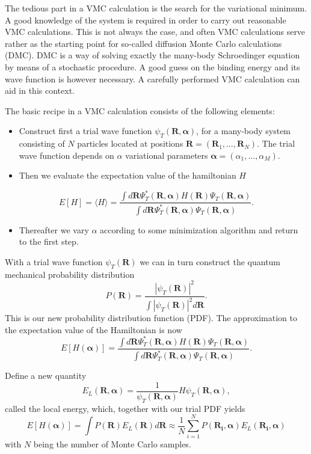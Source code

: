 The tedious part in a VMC calculation is the search for the variational
minimum. A good knowledge of the system is required in order to carry out
reasonable VMC calculations. This is not always the case, 
and often VMC calculations 
serve rather as the starting
point for so-called diffusion Monte Carlo calculations (DMC). DMC is a way of
solving exactly the many-body Schroedinger equation by means of 
a stochastic procedure. A good guess on the binding energy
and its wave function is however necessary. 
A carefully performed VMC calculation can aid in this context. 

The basic recipe in a VMC calculation consists of the following elements:

\begin{itemize}
\item Construct first a trial wave function $\psi_T(\bm{R},\bm{\alpha})$,  for a many-body system consisting of $N$ particles located at positions  $\bm{R}=(\bm{R}_1,\dots ,\bm{R}_N)$. The trial wave function depends on $\alpha$ variational parameters $\bm{\alpha}=(\alpha_1,\dots ,\alpha_M)$.

\item Then we evaluate the expectation value of the hamiltonian $H$ 
\end{itemize}

\noindent
\[
   E[H]=\langle H \rangle =
   \frac{\int d\bm{R}\Psi^{\ast}_{T}(\bm{R},\bm{\alpha})H(\bm{R})\Psi_{T}(\bm{R},\bm{\alpha})}
        {\int d\bm{R}\Psi^{\ast}_{T}(\bm{R},\bm{\alpha})\Psi_{T}(\bm{R},\bm{\alpha})}.
\]
\begin{itemize}
\item Thereafter we vary $\alpha$ according to some minimization algorithm and return to the first step.
\end{itemize}

\noindent
With a trial wave function $\psi_T(\bm{R})$ we can in turn construct the quantum mechanical probability distribution
\[
   P(\bm{R})= \frac{\left|\psi_T(\bm{R})\right|^2}{\int \left|\psi_T(\bm{R})\right|^2d\bm{R}}.
\]
This is our new probability distribution function  (PDF).
The approximation to the expectation value of the Hamiltonian is now 
\[
   E[H(\bm{\alpha})] = 
   \frac{\int d\bm{R}\Psi^{\ast}_T(\bm{R},\bm{\alpha})H(\bm{R})\Psi_T(\bm{R},\bm{\alpha})}
        {\int d\bm{R}\Psi^{\ast}_T(\bm{R},\bm{\alpha})\Psi_T(\bm{R},\bm{\alpha})}.
\]

Define a new quantity
\[
   E_L(\bm{R},\bm{\alpha})=\frac{1}{\psi_T(\bm{R},\bm{\alpha})}H\psi_T(\bm{R},\bm{\alpha}),
   \label{eq:locale1}
\]
called the local energy, which, together with our trial PDF yields
\[
  E[H(\bm{\alpha})]=\int P(\bm{R})E_L(\bm{R}) d\bm{R}\approx \frac{1}{N}\sum_{i=1}^NP(\bm{R_i},\bm{\alpha})E_L(\bm{R_i},\bm{\alpha})
  \label{eq:vmc1}
\]
with $N$ being the number of Monte Carlo samples.


